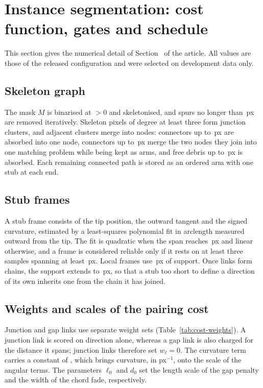 \section{Instance segmentation: cost function, gates and schedule}
\label{supp:recon}

This section gives the numerical detail of Section~ of
the article. All values are those of the released configuration and were
selected on development data only.

\subsection{Skeleton graph}

The mask $M$ is binarised at $>0$ and skeletonised, and spurs no longer than
\PlectaParamSpurPx{}\,px are removed iteratively. Skeleton pixels of degree at
least three form junction clusters, and adjacent clusters merge into nodes:
connectors up to \PlectaParamAbsorbPx{}\,px are absorbed into one node,
connectors up to \PlectaParamJoinPx{}\,px merge the two nodes they join into
one matching problem while being kept as arms, and free debris up to \PlectaParamFreeDebrisPx{}\,px is absorbed. Each
remaining connected path is stored as an ordered arm with one stub at each
end.

\subsection{Stub frames}

A stub frame consists of the tip position, the outward tangent and the signed
curvature, estimated by a least-squares polynomial fit in arclength measured
outward from the tip. The fit is quadratic when the span reaches
\PlectaParamMinQuadratic{}\,px and linear otherwise, and a frame is considered
reliable only if it rests on at least three samples spanning at least
\PlectaParamSpurPx{}\,px. Local frames use \PlectaParamWindowLocal{}\,px of
support. Once links form chains, the support extends to
\PlectaParamWindowChain{}\,px, so that a stub too short to define a direction
of its own inherits one from the chain it has joined.

\subsection{Weights and scales of the pairing cost}

Junction and gap links use separate weight sets
(Table~\ref{tab:cost-weights}). A junction link is scored on direction alone,
whereas a gap link is also charged for the distance it spans; junction links
therefore set $w_\ell=0$. The curvature term carries a constant of
\PlectaParamKappaScale{}, which brings curvature, in px$^{-1}$, onto the scale
of the angular terms. The parameters $\ell_0$ and $d_0$ set the length scale of
the gap penalty and the width of the chord fade, respectively.

